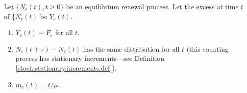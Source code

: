 \begin{proposition}\label{stoch.ross.sp.thm.3.5.2}Let \(\{N_e(t), t \geq 0 \}\) be an equilibrium renewal process. Let the excess at time \(t\) of \(\{N_e(t)\) be \(Y_e(t)\).

\begin{enumerate}[(1)]

\item  \(Y_e(t) \sim F_e\) for all \(t\).

\item \(N_e(t+s) - N_e(t)\) has the same distribution for all \(t\) (this counting process has stationary increments---see Definition \ref{stoch.stationary.increments.def}).

\item \(m_e(t) = t/\mu\).

\end{enumerate}

\end{proposition}

